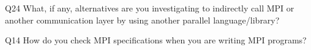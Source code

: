 \begin{description}%
\item{Q24} What, if any, alternatives are you investigating to indirectly call MPI or another communication layer by using another parallel language/library?%
\item{Q14} How do you check MPI specifications when you are writing MPI programs?%
\end{description}%
